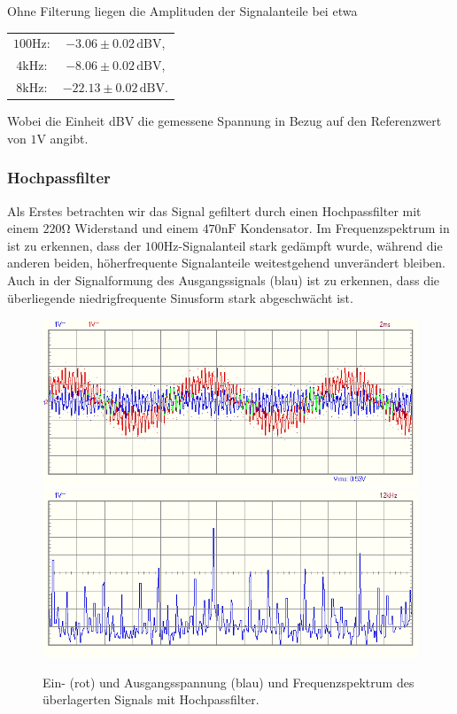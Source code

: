 Ohne Filterung liegen die Amplituden der Signalanteile bei etwa

\renewcommand{\arraystretch}{1.5}
\begin{table}[H]
  \centering
  \begin{tabular}{c c}
    $100\si{\hertz}$: & $-3.06 \pm 0.02\,\mathrm{dBV}$,\\
    $4\si{\kilo\hertz}$: & $-8.06 \pm 0.02\,\mathrm{dBV}$,\\
    $8\si{\kilo\hertz}$: & $-22.13 \pm 0.02\,\mathrm{dBV}$.\\
  \end{tabular}
\end{table}
\renewcommand{\arraystretch}{1}

Wobei die Einheit dBV die gemessene Spannung in Bezug auf den Referenzwert von $1\si{\volt}$ angibt.

\newpage
\subsubsection*{Hochpassfilter}
Als Erstes betrachten wir das Signal gefiltert durch einen Hochpassfilter mit einem $220\si{\ohm}$ Widerstand und einem $470\si{\nano\farad}$ Kondensator. Im Frequenzspektrum in  ist zu erkennen, dass der $100\si{\hertz}$-Signalanteil stark gedämpft wurde, während die anderen beiden, höherfrequente Signalanteile weitestgehend unverändert bleiben. Auch in der Signalformung des Ausgangssignals (blau) ist zu erkennen, dass die überliegende niedrigfrequente Sinusform stark abgeschwächt ist.


\begin{figure}[H]
  \centering
  \includegraphics[width=.8\textwidth]{files/aufgabe8_teil2_hochpass_oszi.png}
  \includegraphics[width=.8\textwidth]{files/aufgabe8_teil2_hochpass_spectrum.png}
  \caption{Ein- (rot) und Ausgangsspannung (blau) und Frequenzspektrum des überlagerten Signals mit Hochpassfilter.}
  \label{fig:aufgabe8_teil2_hochpass}
\end{figure}

